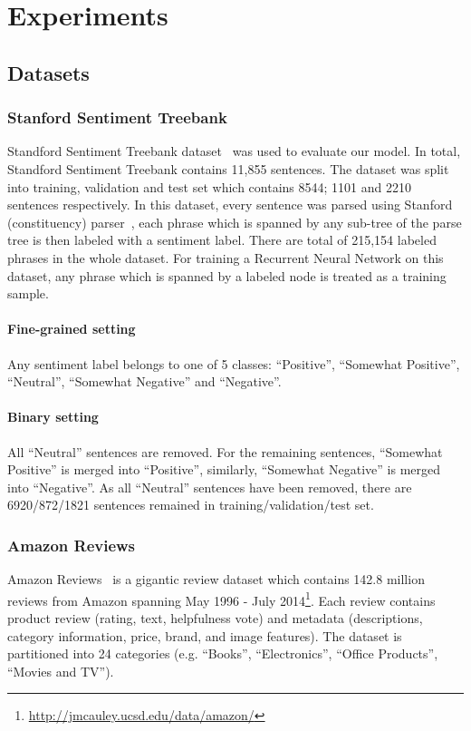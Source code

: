 \section{Experiments}
\subsection{Datasets}
\subsubsection{Stanford Sentiment Treebank} \label{sec:sst}
Standford Sentiment Treebank dataset~\cite{socher2013recursive} was used to evaluate our model.
In total, Standford Sentiment Treebank contains 11,855 sentences.
The dataset was split into training, validation and test set which contains 8544; 1101 and 2210 sentences respectively.
In this dataset, every sentence was parsed using Stanford (constituency) parser~\cite{socher2013recursive}, each phrase which is spanned by any sub-tree of the parse tree is then labeled with  a sentiment label.
There are total of 215,154 labeled phrases in the whole dataset.
For training a Recurrent Neural Network on this dataset, any phrase which is spanned by a labeled node is treated as a training sample. 
\paragraph{Fine-grained setting} Any sentiment label belongs to one of 5 classes: ``Positive'', ``Somewhat Positive'', ``Neutral'', ``Somewhat Negative'' and ``Negative''.
\paragraph{Binary setting} All ``Neutral'' sentences are removed.
For the remaining sentences, ``Somewhat Positive'' is merged into ``Positive'', similarly, ``Somewhat Negative'' is merged into ``Negative''.
As all ``Neutral'' sentences have been removed, there are 6920/872/1821 sentences remained in training/validation/test set.
\subsubsection{Amazon Reviews}\label{sec:amazon}
Amazon Reviews~\cite{amazon-reviews} is a gigantic review dataset
which contains 142.8 million reviews from Amazon spanning May 1996 - July 2014\footnote{\url{http://jmcauley.ucsd.edu/data/amazon/}}.
Each review contains product review (rating, text, helpfulness vote) and metadata (descriptions, category information, price, brand, and image features).
The dataset is partitioned into 24 categories (e.g. ``Books'', ``Electronics'', ``Office Products'', ``Movies and TV'').
